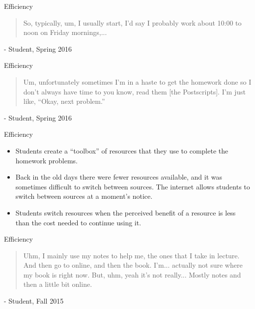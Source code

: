 \documentclass[xcolor=x11names,compress]{beamer}
\begin{document}
\begin{frame}{Efficiency}
	\begin{quote}
		So, typically, um, I usually start, I'd say I probably work about 10:00 to noon on Friday mornings,...
	\end{quote}
	\vspace{5mm}
	- Student, Spring 2016
\end{frame}

\begin{frame}{Efficiency}
	\begin{quote}
		Um, unfortunately sometimes I'm in a haste to get the homework done so I don't always have time to you know, read them [the Postscripts]. I'm just like, ``Okay, next problem.''
	\end{quote}
	\vspace{5mm}
	- Student, Spring 2016
\end{frame}

\begin{frame}{Efficiency}
	\begin{itemize}
		\item Students create a ``toolbox'' of resources that they use to complete the homework problems.
		\item Back in the old days there were fewer resources available, and it was sometimes difficult to switch between sources. The internet allows students to switch between sources at a moment's notice.
		\item Students switch resources when the perceived benefit of a resource is less than the cost needed to continue using it.
	\end{itemize}
\end{frame}

\begin{frame}{Efficiency}
	\begin{quote}
		Uhm, I mainly use my notes to help me, the ones that I take in lecture. And then go to online, and then the book. I'm... actually not sure where my book is right now. But, uhm, yeah it's not really... Mostly notes and then a little bit online.
	\end{quote}
	\vspace{5mm}
	- Student, Fall 2015
\end{frame}
\end{document}
